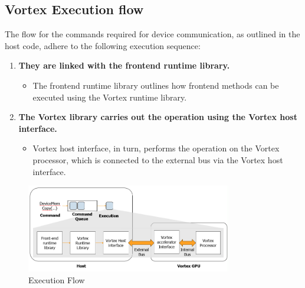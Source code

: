 \documentclass[12pt]{report}
\begin{document}
\subsection{Vortex Execution flow}
The flow for the commands required for device communication, as outlined in the host code, adhere to the following execution sequence:
\begin{enumerate}
    \item \textbf{They are linked with the frontend runtime library.}
        \begin{itemize}
            \item The frontend runtime library outlines how frontend methods can be executed using the Vortex runtime library.
        \end{itemize}
    \item \textbf{The Vortex library carries out the operation using the Vortex host interface. 
}
        \begin{itemize}
            \item Vortex host interface, in turn, performs the operation on the Vortex processor, which is connected to the external bus via the Vortex host interface.
        \end{itemize}
\end{enumerate}
\begin{figure}[H]
    \centering
    \includegraphics[width=0.8\textwidth]{./figures/execution_flow.png}
    \caption{Execution Flow}
\end{figure}







\nocite{Satriawan2023}
\nocite{aamodt2018general}
\nocite{hennessy2011computer}
\nocite{vortex2023}
\end{document}
